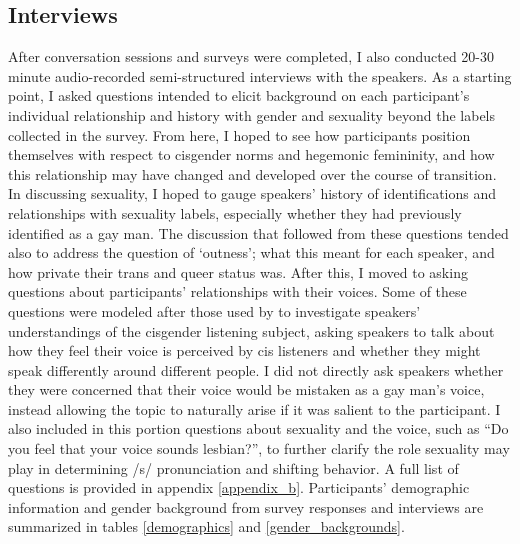 \documentclass[12pt,twoside]{reedthesis}
\begin{document}
\subsection{Interviews}
After conversation sessions and surveys were completed, I also conducted 20-30 minute audio-recorded semi-structured interviews with the speakers. As a starting point, I asked questions intended to elicit background on each participant's individual relationship and history with gender and sexuality beyond the labels collected in the survey. From here, I hoped to see how participants position themselves with respect to cisgender norms and hegemonic femininity, and how this relationship may have changed and developed over the course of transition. In discussing sexuality, I hoped to gauge speakers' history of identifications and relationships with sexuality labels, especially whether they had previously identified as a gay man. The discussion that followed from these questions tended also to address the question of `outness'; what this meant for each speaker, and how private their trans and queer status was. After this, I moved to asking questions about participants' relationships with their voices. Some of these questions were modeled after those used by \textcite{heffernan_constructing_2023} to investigate speakers' understandings of the cisgender listening subject, asking speakers to talk about how they feel their voice is perceived by cis listeners and whether they might speak differently around different people. I did not directly ask speakers whether they were concerned that their voice would be mistaken as a gay man's voice, instead allowing the topic to naturally arise if it was salient to the participant. I also included in this portion questions about sexuality and the voice, such as ``Do you feel that your voice sounds lesbian?'', to further clarify the role sexuality may play in determining /s/ pronunciation and shifting behavior. A full list of questions is provided in appendix \ref{appendix_b}. Participants' demographic information and gender background from survey responses and interviews are summarized in tables \ref{demographics} and \ref{gender_backgrounds}.
\end{document}
